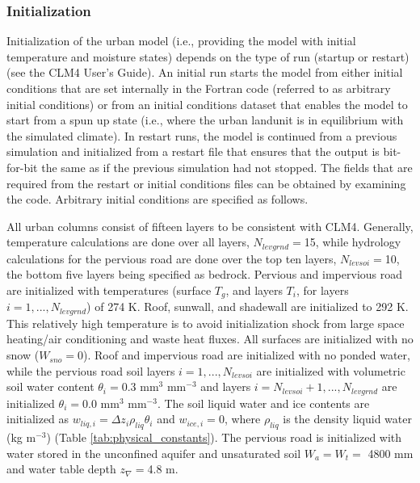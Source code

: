 \documentclass[12pt,authoryear]{elsarticle}
\numberwithin{equation}{section} %
\begin{document}
\subsubsection{Initialization}
%
Initialization of the urban model (i.e., providing the model with initial temperature and moisture states) depends on the type of run (startup or restart) (see the CLM4 User’s Guide). An initial run starts the model from either initial conditions that are set internally in the Fortran code (referred to as arbitrary initial conditions) or from an initial conditions dataset that enables the model to start from a spun up state (i.e., where the urban landunit is in equilibrium with the simulated climate). In restart runs, the model is continued from a previous simulation and initialized from a restart file that ensures that the output is bit-for-bit the same as if the previous simulation had not stopped. The fields that are required from the restart or initial conditions files can be obtained by examining the code. Arbitrary initial conditions are specified as follows.

All urban columns consist of fifteen layers to be consistent with CLM4. Generally,
temperature calculations are done over all layers, $N_{levgrnd}=$15, while hydrology calculations for the pervious road are done over the top ten layers, $N_{levsoi}=$10, the bottom five layers being specified as bedrock. Pervious and impervious road are initialized with temperatures (surface $T_{g}$, and layers $T_{i}$, for layers $i=1,...,N_{levgrnd}$) of 274 K. Roof, sunwall, and shadewall are initialized to 292 K. This relatively high temperature is to avoid initialization shock from large space heating/air conditioning and waste heat fluxes. All surfaces are initialized with no snow ($W_{sno}=$0). Roof and impervious road are initialized with no ponded water, while the pervious road soil layers $i=1,...,N_{levsoi}$ are initialized with volumetric soil water content $\theta_{i}=$0.3 mm$^{3}$ mm$^{-3}$ and layers $i=N_{levsoi}+1,...,N_{levgrnd}$ are initialized $\theta_{i}=0.0$ mm$^{3}$ mm$^{-3}$. The soil liquid water and ice contents are initialized as $w_{liq,i}=\Delta z_{i}\rho_{liq}\theta_{i}$ and $w_{ice,i}=0$, where $\rho_{liq}$ is the density liquid water (kg m$^{-3}$) (Table \ref{tab:physical_constants}). The pervious road is initialized with water stored in the unconfined aquifer and unsaturated soil $W_{a}=W_{t}=$ 4800 mm and water table depth $z_{\nabla}=$4.8 m.
\end{document}
